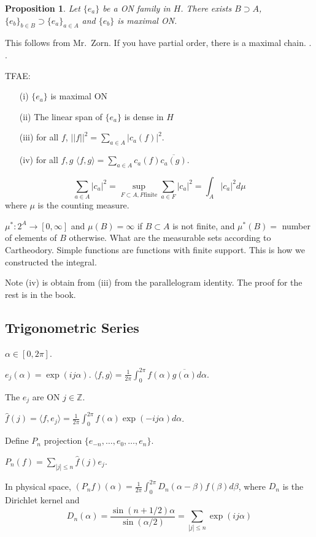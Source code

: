 \documentclass[11pt]{article}
\newtheorem{prop}[thm]{Proposition}
\newcommand{\mb}[1]{\mbox{#1}}
\newcommand{\ov}[1]{\overline{#1}}
\newcommand{\ld}{\ldots}
\newcommand{\ra}{\rightarrow}
\newcommand{\sbs}{\subset}
\newcommand{\sps}{\supset}
\newcommand{\lan}{\langle}
\newcommand{\ran}{\rangle}
\newcommand{\al}{\alpha}
\newcommand{\be}{\beta}
\newcommand{\su}[2]{\sum_{#1}^{#2}}
\newcommand{\fr}[2]{\frac{#1}{#2}}
\newcommand{\z}{\mathbb{Z}}
\begin{document}
\begin{prop}
Let $\{e_a\}$ be a ON family in $H$. There exists $B\sps A$, $\{e_b\}_{b\in B}\sps\{e_a\}_{a\in A}$ and $\{e_b\}$ is maximal ON. 
\end{prop}

This follows from Mr.\ Zorn. If you have partial order, there is a maximal chain. . . 

TFAE: 
\begin{itemize}
\item[(i)] $\{e_a\}$ is maximal ON
\item[(ii)] The linear span of $\{e_a\}$ is dense in $H$
\item[(iii)] for all $f$, $||f||^2=\su{a\in A}{}|c_a(f)|^2$. 
\item[(iv)] for all $f,g$ $\lan f,g\ran=\su{a\in A}{}c_a(f)\ov{c_a(g)}$. 
\end{itemize}

\[\su{a\in A}{}|c_a|^2=\sup_{F\sbs A, F\mb{finite}}\su{a\in F}{}|c_a|^2=\int_A|c_a|^2d\mu\] where $\mu$ is the counting measure. 

$\mu^*:2^A\ra[0,\infty]$ and $\mu(B)=\infty$ if $B\sbs A$ is not finite, and $\mu^*(B)=$ number of elements of $B$ otherwise. What are the measurable sets according to Cartheodory. Simple functions are functions with finite support. This is how we constructed the integral. 

Note (iv) is obtain from (iii) from the parallelogram identity. The proof for the rest is in the book.

\subsection{Trigonometric Series}

$\al\in[0,2\pi]$. 

$e_j(\al)=\exp(ij\al)$. $\lan f,g\ran=\fr{1}{2\pi}\int_0^{2\pi}f(\al)\ov{g(\al)}d\al$. 

The $e_j$ are ON $j\in\z$. 

$\hat f(j)=\lan f,e_j\ran=\fr{1}{2\pi}\int_0^{2\pi}f(\al)\exp(-ij\al)d\al$. 

Define $P_n$ projection $\{e_{-n},\ld,e_0,\ld,e_n\}$. 

$P_n(f)=\su{|j|\le n}{}\hat f(j)e_j$. 

In physical space, $(P_nf)(\al)=\fr{1}{2\pi}\int_0^{2\pi}D_n(\al-\be)f(\be)d\be$, where $D_n$ is the Dirichlet kernel and 
\[D_n(\al)=\fr{\sin(n+1/2)\al}{\sin(\al/2)}=\su{|j|\le n}{}\exp(ij\al)\]
\end{document}
